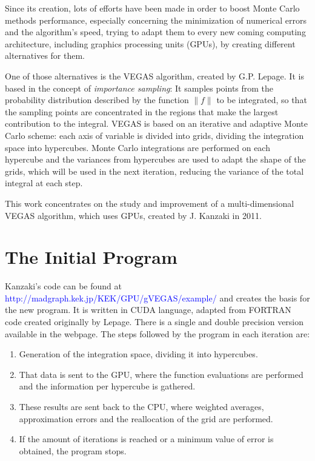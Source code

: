 \documentclass[english]{maciarticle}
\begin{document}
Since its creation, lots of efforts have been made in order to boost Monte Carlo methods performance, especially concerning the minimization of numerical errors and the algorithm's speed, trying to adapt them to every new coming computing architecture, including graphics processing units (GPUs), by creating different alternatives for them\cite{montesurvey}.

One of those alternatives is the VEGAS algorithm, created by G.P. Lepage\cite{vegas}. It is based in the concept of \textit{importance sampling}: It samples points from the probability distribution described by the function $\|f\|$ to be integrated, so that the sampling points are concentrated in the regions that make the largest contribution to the integral. VEGAS is based on an iterative and adaptive Monte Carlo scheme: each axis of variable is divided into grids, dividing the integration space into hypercubes. Monte Carlo integrations are performed on each hypercube and the variances from hypercubes are used to adapt the shape of the grids, which will be used in the next iteration, reducing the variance of the total integral at each step.

This work concentrates on the study and improvement of a multi-dimensional VEGAS algorithm, which uses GPUs, created by J. Kanzaki in 2011\cite{kanzaki}.

\section{The Initial Program} 
Kanzaki's code can be found at \textcolor{blue}{http://madgraph.kek.jp/KEK/GPU/gVEGAS/example/} and creates the basis for the new program. It is written in CUDA language, adapted from FORTRAN code created originally by Lepage\cite{lepagecode}. There is a single and double precision version available in the webpage. The steps followed by the program in each iteration are:

\begin{enumerate}
	\item Generation of the integration space, dividing it into hypercubes.
	\item \vspace{-0.3cm} That data is sent to the GPU, where the function evaluations are performed and the information per hypercube is gathered.
	\item \vspace{-0.3cm} These results are sent back to the CPU, where weighted averages, approximation errors and the reallocation of the grid are performed.
	\item \vspace{-0.6cm} If the amount of iterations is reached or a minimum value of error is obtained, the program stops.
\end{enumerate} 
\end{document}
